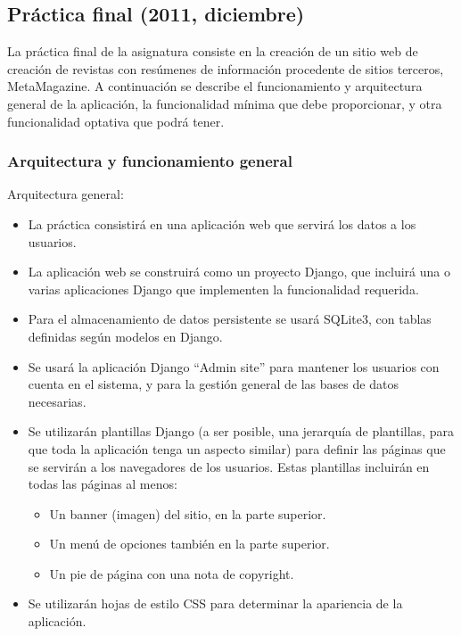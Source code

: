 \subsection{Práctica final (2011, diciembre)}
\label{practica-final-2011-12}


La práctica final de la asignatura consiste en la creación de un sitio web de creación de revistas con resúmenes de información procedente de sitios terceros, MetaMagazine. A continuación se describe el funcionamiento y arquitectura general de la aplicación, la funcionalidad mínima que debe proporcionar, y otra funcionalidad optativa que podrá tener.

\subsubsection{Arquitectura y funcionamiento general}

Arquitectura general:

\begin{itemize}
\item La práctica consistirá en una aplicación web que servirá los datos a los usuarios.

\item La aplicación web se construirá como un proyecto Django, que incluirá una o varias aplicaciones Django que implementen la funcionalidad requerida.

\item Para el almacenamiento de datos persistente se usará SQLite3, con tablas definidas según modelos en Django.

\item Se usará la aplicación Django ``Admin site'' para mantener los usuarios con cuenta en el sistema, y para la gestión general de las bases de datos necesarias.

\item Se utilizarán plantillas Django (a ser posible, una jerarquía de plantillas, para que toda la aplicación tenga un aspecto similar) para definir las páginas que se servirán a los navegadores de los usuarios. Estas plantillas incluirán en todas las páginas al menos:
  \begin{itemize}
  \item Un banner (imagen) del sitio, en la parte superior.
  \item Un menú de opciones también en la parte superior.
  \item Un pie de página con una nota de copyright.
  \end{itemize}

\item Se utilizarán hojas de estilo CSS para determinar la apariencia de la aplicación.
\end{itemize}

